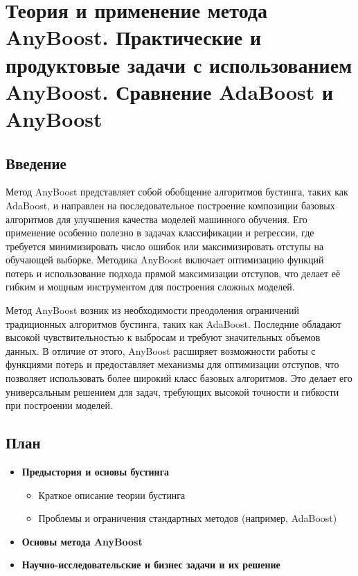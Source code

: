 \section*{Теория и применение метода AnyBoost. Практические и продуктовые задачи с использованием AnyBoost. Сравнение AdaBoost и AnyBoost}
\subsection*{Введение}
Метод AnyBoost представляет собой обобщение алгоритмов бустинга, таких как AdaBoost, и направлен на последовательное построение композиции базовых алгоритмов для улучшения качества моделей машинного обучения. Его применение особенно полезно в задачах классификации и регрессии, где требуется минимизировать число ошибок или максимизировать отступы на обучающей выборке. Методика AnyBoost включает оптимизацию функций потерь и использование подхода прямой максимизации отступов, что делает её гибким и мощным инструментом для построения сложных моделей.

Метод AnyBoost возник из необходимости преодоления ограничений традиционных алгоритмов бустинга, таких как AdaBoost. Последние обладают высокой чувствительностью к выбросам и требуют значительных объемов данных. В отличие от этого, AnyBoost расширяет возможности работы с функциями потерь и предоставляет механизмы для оптимизации отступов, что позволяет использовать более широкий класс базовых алгоритмов. Это делает его универсальным решением для задач, требующих высокой точности и гибкости при построении моделей.

\subsection*{План}

\begin{itemize}
    \item \textbf{Предыстория и основы бустинга}
    \begin{itemize}
        \item Краткое описание теории бустинга
        \item Проблемы и ограничения стандартных методов (например, AdaBoost)
    \end{itemize}
    \item \textbf{Основы метода AnyBoost}
    \item \textbf{Научно-исследовательские и бизнес задачи и их решение}
\end{itemize}

